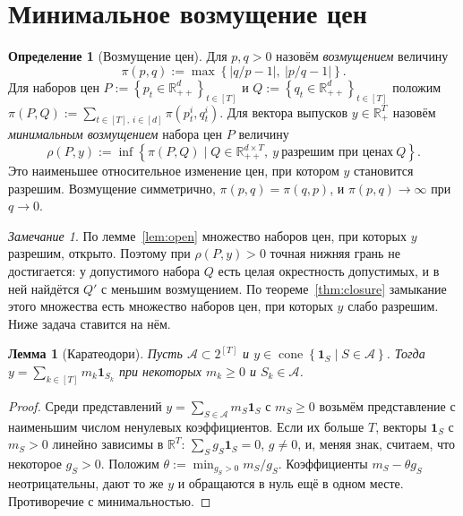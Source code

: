 \documentclass[a4paper,11pt]{article}
\theoremstyle{plain}
\newtheorem{lemma}[theorem]{Лемма}
\theoremstyle{definition}
\newtheorem{definition}[theorem]{Определение}
\theoremstyle{remark}
\newtheorem*{remark}{Замечание}
\newcommand{\R}{\mathbb{R}}
\newcommand{\abs}[1]{\left\lvert #1 \right\rvert}
\newcommand{\set}[1]{\left\{ #1 \right\}}
\newcommand{\Rpp}[1][2]{\R^{#1}_{++}} %
\newcommand{\Rp}[1][2]{\R^{#1}_{+}}   %
\DeclareMathOperator{\cone}{cone}
\begin{document}
\setcounter{section}{5} %

\section{Минимальное возмущение цен}

\begin{definition}[Возмущение цен]\label{def:perturbation}
    Для $p,q>0$ назовём \textit{возмущением} величину
    \[
        \pi(p,q):=\max\set{\abs{q/p-1},\ \abs{p/q-1}}.
    \]
    Для наборов цен $P:=\set{p_t\in\Rpp[d]}_{t\in[T]}$ и $Q:=\set{q_t\in\Rpp[d]}_{t\in[T]}$ положим $\pi(P,Q):=\sum_{t\in[T],\,i\in[d]}\pi(p^i_t,q^i_t)$. Для вектора выпусков $y\in\Rp[T]$ назовём \textit{минимальным возмущением} набора цен $P$ величину
    \[
        \rho(P,y):=\inf\set{\pi(P,Q)\mid Q\in\Rpp[d\times T],\ y\ \text{разрешим при ценах}\ Q}.
    \]
    Это наименьшее относительное изменение цен, при котором $y$ становится разрешим. Возмущение симметрично, $\pi(p,q)=\pi(q,p)$, и $\pi(p,q)\to\infty$ при $q\to0$.
\end{definition}

\begin{remark}
    По лемме~\ref{lem:open} множество наборов цен, при которых $y$ разрешим, открыто. Поэтому при $\rho(P,y)>0$ точная нижняя грань не достигается: у допустимого набора $Q$ есть целая окрестность допустимых, и в ней найдётся $Q'$ с меньшим возмущением. По теореме~\ref{thm:closure} замыкание этого множества есть множество наборов цен, при которых $y$ слабо разрешим. Ниже задача ставится на нём.
\end{remark}

\begin{lemma}[Каратеодори]\label{lem:cara}
    Пусть $\mathcal A\subset2^{[T]}$ и $y\in\cone\set{\mathbf 1_S\mid S\in\mathcal A}$. Тогда $y=\sum_{k\in[T]}m_k\mathbf 1_{S_k}$ при некоторых $m_k\ge0$ и $S_k\in\mathcal A$.
\end{lemma}

\begin{proof}
    Среди представлений $y=\sum_{S\in\mathcal A}m_S\mathbf 1_S$ с $m_S\ge0$ возьмём представление с наименьшим числом ненулевых коэффициентов. Если их больше $T$, векторы $\mathbf 1_S$ с $m_S>0$ линейно зависимы в $\R^T$: $\sum_Sg_S\mathbf 1_S=0$, $g\ne0$, и, меняя знак, считаем, что некоторое $g_S>0$. Положим $\theta:=\min_{g_S>0}m_S/g_S$. Коэффициенты $m_S-\theta g_S$ неотрицательны, дают то же $y$ и обращаются в нуль ещё в одном месте. Противоречие с минимальностью.
\end{proof}
\end{document}

